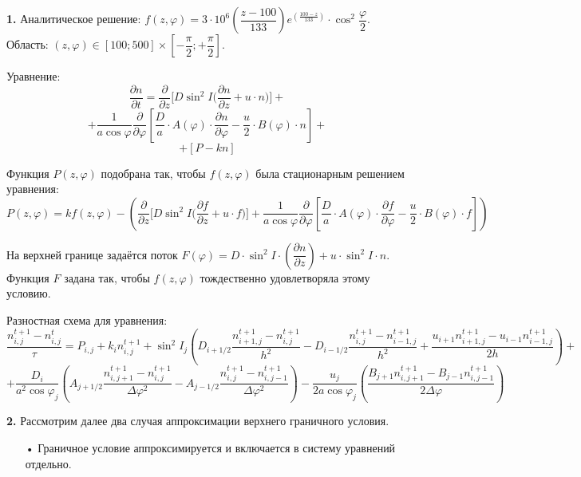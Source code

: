 \documentclass[2pt, a4paper, fleqn]{extarticle}
\begin{document}
{\bf 1.} Аналитическое решение: $f(z, \varphi) = 3\cdot10^6\left(\dfrac{z-100}{133}\right)e^{\left(\frac{100-z}{133}\right)}\cdot \cos^2 \dfrac{\varphi}{2}$. Область: $(z, \varphi) \in [100;500]\times\left[-\dfrac{\pi}{2}; +\dfrac{\pi}{2}\right]$.

Уравнение: $$\dfrac{\partial n}{\partial t} = \dfrac{\partial}{\partial z}\bigg[D\sin^2 I \bigg(\dfrac{\partial n}{\partial z}+u\cdot n\bigg)\bigg]+$$ $$+\dfrac{1}{a\cos\varphi} \dfrac{\partial }{\partial \varphi}\left[\dfrac{D}{a}\cdot A(\varphi)\cdot\dfrac{\partial n}{\partial \varphi} - \dfrac{u}{2}\cdot B(\varphi)\cdot n \right] +$$ $$+ [P-kn]$$

Функция $P(z, \varphi)$ подобрана так, чтобы $f(z, \varphi)$ была стационарным решением уравнения: 
$$P(z, \varphi) = k f(z, \varphi) - \left(\dfrac{\partial}{\partial z}\bigg[D\sin^2 I \bigg(\dfrac{\partial f}{\partial z}+u\cdot f\bigg)\bigg]+\dfrac{1}{a\cos\varphi} \dfrac{\partial }{\partial \varphi}\left[\dfrac{D}{a}\cdot A(\varphi)\cdot\dfrac{\partial f}{\partial \varphi} - \dfrac{u}{2}\cdot B(\varphi)\cdot f \right]\right)$$

На верхней границе задаётся поток $F(\varphi) = D\cdot\sin^2 I\cdot \left(\dfrac{\partial n}{\partial z}\right) + u\cdot\sin^2 I \cdot n$. Функция $F$ задана так, чтобы $f(z, \varphi)$ тождественно удовлетворяла этому условию.

Разностная схема для уравнения: $$\dfrac{n_{i, j}^{t+1}-n_{i, j}^t}{\tau} = P_{i, j} + k_{i}n_{i, j}^{t+1} + \sin^2 I_j \left( D_{i+1/2}\dfrac{n_{i+1, j}^{t+1} - n_{i, j}^{t+1}}{h^2} - D_{i-1/2}\dfrac{n_{i, j}^{t+1} - n_{i-1, j}^{t+1}}{h^2} + \dfrac{u_{i+1}n_{i+1, j}^{t+1} - u_{i-1}n_{i-1, j}^{t+1}}{2h} \right) + $$ $$+ \dfrac{D_i}{a^2\cos\varphi_j} \left(A_{j+1/2}\dfrac{n_{i, j+1}^{t+1}-n_{i, j}^{t+1}}{\Delta\varphi^2} - A_{j-1/2}\dfrac{n_{i, j}^{t+1}-n_{i, j-1}^{t+1}}{\Delta\varphi^2}\right) -\dfrac{u_j}{2a\cos\varphi_j} \left(\dfrac{B_{j+1} n_{i, j+1}^{t+1} - B_{j-1}n_{i, j-1}^{t+1}}{2\Delta\varphi} \right)$$

\bigskip

{\bf 2.} Рассмотрим далее два случая аппроксимации верхнего граничного условия.

\begin{itemize}

\item[•] Граничное условие аппроксимируется и включается в систему уравнений отдельно.

\end{itemize}
\end{document}
